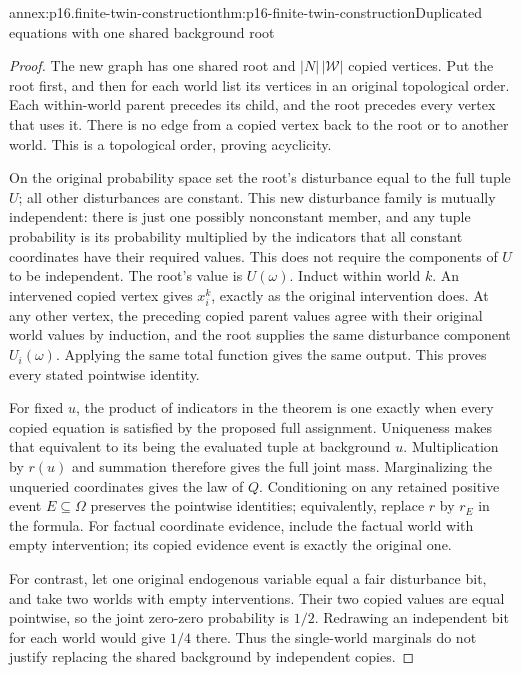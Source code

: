 \begin{annexitem}{annex:p16.finite-twin-construction}{thm:p16-finite-twin-construction}{Duplicated equations with one shared background root}
\begin{proof}
The new graph has one shared root and \(|N|\,|\mathcal W|\)
copied vertices. Put the root first, and then for each world list its
vertices in an original topological order. Each within-world parent
precedes its child, and the root precedes every vertex that uses it.
There is no edge from a copied vertex back to the root or to another
world. This is a topological order, proving acyclicity.

On the original probability space set the root's disturbance equal
to the full tuple \(U\); all other disturbances are constant.
This new disturbance family is mutually independent: there is just
one possibly nonconstant member, and any tuple probability is its
probability multiplied by the indicators that all constant coordinates
have their required values. This does not require the components of
\(U\) to be independent. The root's value is \(U(\omega)\).
Induct within world \(k\). An intervened copied vertex gives
\(x_i^k\), exactly as the original intervention does. At any other
vertex, the preceding copied parent values agree with their original
world values by induction, and the root supplies the same disturbance
component \(U_i(\omega)\). Applying the same total function
gives the same output. This proves every stated pointwise identity.

For fixed \(u\), the product of indicators in the theorem is one
exactly when every copied equation is satisfied by the proposed full
assignment. Uniqueness makes that equivalent to its being the evaluated
tuple at background \(u\). Multiplication by \(r(u)\) and summation
therefore gives the full joint mass. Marginalizing the unqueried
coordinates gives the law of \(Q\). Conditioning on any retained
positive event \(E\subseteq\Omega\) preserves the pointwise
identities; equivalently, replace \(r\) by \(r_E\) in the formula.
For factual coordinate evidence, include the factual world with empty
intervention; its copied evidence event is exactly the original one.

For contrast, let one original endogenous variable equal a fair
disturbance bit, and take two worlds with empty interventions. Their
two copied values are equal pointwise, so the joint zero-zero
probability is \(1/2\). Redrawing an independent bit for each
world would give \(1/4\) there. Thus the single-world marginals
do not justify replacing the shared background by independent copies.
\end{proof}
\end{annexitem}

